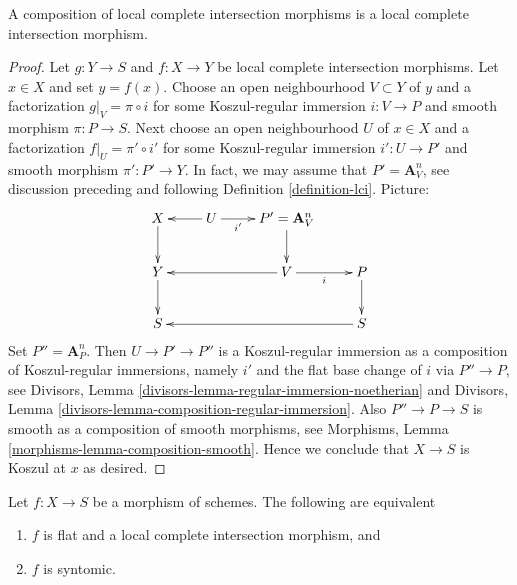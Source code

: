 \begin{lemma}
\label{lemma-composition-lci}
A composition of local complete intersection morphisms
is a local complete intersection morphism.
\end{lemma}

\begin{proof}
Let $g : Y \to S$ and $f : X \to Y$ be local complete intersection
morphisms. Let $x \in X$ and set $y = f(x)$. Choose an open neighbourhood
$V \subset Y$ of $y$ and a factorization $g|_V = \pi \circ i$ for some
Koszul-regular immersion $i : V \to P$ and smooth morphism $\pi : P \to S$.
Next choose an open neighbourhood $U$ of $x \in X$ and a factorization
$f|_U = \pi' \circ i'$ for some Koszul-regular immersion $i' : U \to P'$
and smooth morphism $\pi' : P' \to Y$. In fact, we may assume that
$P' = \mathbf{A}^n_V$, see discussion preceding and following
Definition \ref{definition-lci}. Picture:
$$
\xymatrix{
X \ar[d] & U \ar[l] \ar[r]_-{i'} & P' = \mathbf{A}^n_V \ar[d] \\
Y \ar[d] &  & V \ar[ll] \ar[r]_i & P \ar[d] \\
S & & & S \ar[lll]
}
$$
Set $P'' = \mathbf{A}^n_P$. Then $U \to P' \to P''$ is a
Koszul-regular immersion as a composition
of Koszul-regular immersions, namely $i'$ and the flat base change of
$i$ via $P'' \to P$, see
Divisors,
Lemma \ref{divisors-lemma-regular-immersion-noetherian}
and
Divisors, Lemma \ref{divisors-lemma-composition-regular-immersion}.
Also $P'' \to P \to S$ is smooth as a composition of smooth morphisms,
see
Morphisms, Lemma \ref{morphisms-lemma-composition-smooth}.
Hence we conclude that $X \to S$ is Koszul at $x$ as desired.
\end{proof}

\begin{lemma}
\label{lemma-flat-lci}
Let $f : X \to S$ be a morphism of schemes.
The following are equivalent
\begin{enumerate}
\item $f$ is flat and a local complete intersection morphism, and
\item $f$ is syntomic.
\end{enumerate}
\end{lemma}

